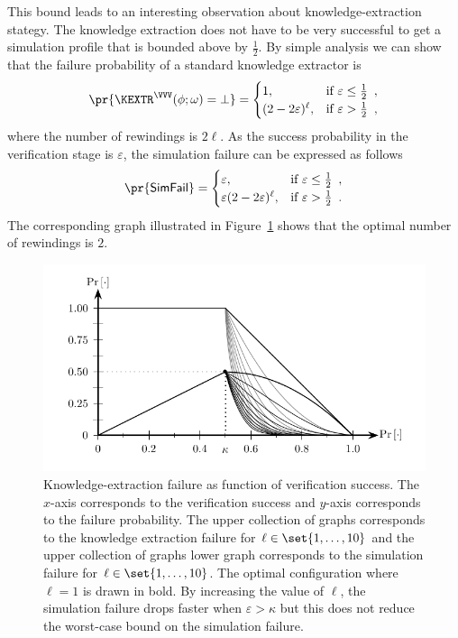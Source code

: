 \documentclass{crypto-exercise}
\newcommand{\SFAIL}{\mathsf{SimFail}}
\begin{document}
\begin{solution}
This bound leads to an interesting observation about knowledge-extraction stategy. The knowledge extraction does not have to be very successful to get a simulation profile that is bounded above by $\frac{1}{2}$. By simple analysis we can show that the failure probability of a standard knowledge extractor is
\begin{align*}    
\pr{\KEXTR^{\VVV}(\phi;\omega)=\bot}= 
\begin{cases}
1,&\text{if }\varepsilon\leq\frac{1}{2}\enspace,\\
(2-2\varepsilon)^\ell,&\text{if }\varepsilon>\frac{1}{2}\enspace,\\
\end{cases}
\end{align*}
where the number of rewindings is $2\ell$. As the success probability in the verification stage is $\varepsilon$, the simulation failure can be expressed as follows
\begin{align*}    
\pr{\SFAIL}= 
\begin{cases}
\varepsilon,&\text{if }\varepsilon\leq\frac{1}{2}\enspace,\\
\varepsilon(2-2\varepsilon)^\ell,&\text{if }\varepsilon>\frac{1}{2}\enspace.\\
\end{cases}
\end{align*}
The corresponding graph illustrated in Figure~\ref{fig:knowledge-extraction-trade-offs} shows that the optimal number of rewindings is $2$.  

\begin{figure}[!h]
   \centering
   \includegraphics[scale=0.85]{figures/1102-simulation-failure-ii}
   \caption{Knowledge-extraction failure as function of verification success. The $x$-axis corresponds to the verification success and $y$-axis corresponds to the failure probability. The upper collection of graphs  corresponds to the knowledge extraction failure for $\ell\in\set{1,\ldots,10}$ and the upper collection of graphs lower graph corresponds to the simulation failure for $\ell\in\set{1,\ldots,10}$. The optimal configuration where $\ell=1$ is drawn in bold. By increasing the value of $\ell$, the simulation failure drops faster when $\varepsilon>\kappa$ but this does not reduce the worst-case bound on the simulation failure.}
   \label{fig:knowledge-extraction-trade-offs}
\end{figure}


\end{solution}
\end{document}
